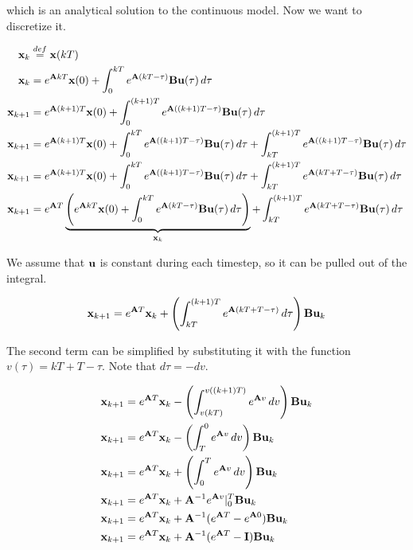 which is an analytical solution to the continuous model. Now we want to
discretize it.

\begin{align*}
  \mathbf{x}_k &\stackrel{def}{=} \mathbf{x}(kT) \\
  \mathbf{x}_k &= e^{\mathbf{A}kT}\mathbf{x}(0) +
    \int_0^{kT} e^{\mathbf{A}(kT - \tau)}\mathbf{B}\mathbf{u}(\tau) \,d\tau \\
  \mathbf{x}_{k+1} &= e^{\mathbf{A}(k + 1)T}\mathbf{x}(0) +
    \int_0^{(k + 1)T} e^{\mathbf{A}((k + 1)T - \tau)}\mathbf{B}\mathbf{u}(\tau) \,d\tau
    \\
  \mathbf{x}_{k+1} &= e^{\mathbf{A}(k + 1)T}\mathbf{x}(0) +
    \int_0^{kT} e^{\mathbf{A}((k + 1)T - \tau)}\mathbf{B}\mathbf{u}(\tau) \,d\tau +
    \int_{kT}^{(k + 1)T} e^{\mathbf{A}((k + 1)T - \tau)}\mathbf{B}\mathbf{u}(\tau)
    \,d\tau \\
  \mathbf{x}_{k+1} &= e^{\mathbf{A}(k + 1)T}\mathbf{x}(0) +
    \int_0^{kT} e^{\mathbf{A}((k + 1)T - \tau)}\mathbf{B}\mathbf{u}(\tau) \,d\tau +
    \int_{kT}^{(k + 1)T} e^{\mathbf{A}(kT + T - \tau)}\mathbf{B}\mathbf{u}(\tau) \,d\tau
    \\
  \mathbf{x}_{k+1} &= e^{\mathbf{A}T} \underbrace{\left(e^{\mathbf{A}kT}\mathbf{x}(0) +
    \int_0^{kT} e^{\mathbf{A}(kT - \tau)}\mathbf{B}\mathbf{u}(\tau)
    \,d\tau\right)}_{\mathbf{x}_k} +
    \int_{kT}^{(k + 1)T} e^{\mathbf{A}(kT + T - \tau)}\mathbf{B}\mathbf{u}(\tau) \,d\tau
\end{align*}

We assume that $\mathbf{u}$ is constant during each timestep, so it can be pulled
out of the integral.

\begin{equation*}
  \mathbf{x}_{k+1} = e^{\mathbf{A}T}\mathbf{x}_k +
    \left(\int_{kT}^{(k + 1)T} e^{\mathbf{A}(kT + T - \tau)} \,d\tau\right)
    \mathbf{B}\mathbf{u}_k
\end{equation*}

The second term can be simplified by substituting it with the function
$v(\tau) = kT + T - \tau$. Note that $d\tau = -dv$.

\begin{align*}
  \mathbf{x}_{k+1} &= e^{\mathbf{A}T}\mathbf{x}_k -
    \left(\int_{v(kT)}^{v((k + 1)T)} e^{\mathbf{A}v} \,dv\right)
    \mathbf{B}\mathbf{u}_k \\
  \mathbf{x}_{k+1} &= e^{\mathbf{A}T}\mathbf{x}_k -
    \left(\int_T^0 e^{\mathbf{A}v} \,dv\right) \mathbf{B}\mathbf{u}_k \\
  \mathbf{x}_{k+1} &= e^{\mathbf{A}T}\mathbf{x}_k +
    \left(\int_0^T e^{\mathbf{A}v} \,dv\right) \mathbf{B}\mathbf{u}_k \\
  \mathbf{x}_{k+1} &= e^{\mathbf{A}T}\mathbf{x}_k +
    \mathbf{A}^{-1}e^{\mathbf{A}v} \rvert_0^T \mathbf{B}\mathbf{u}_k \\
  \mathbf{x}_{k+1} &= e^{\mathbf{A}T}\mathbf{x}_k +
    \mathbf{A}^{-1}(e^{\mathbf{A}T} - e^{\mathbf{A}0}) \mathbf{B}\mathbf{u}_k \\
  \mathbf{x}_{k+1} &= e^{\mathbf{A}T}\mathbf{x}_k +
    \mathbf{A}^{-1}(e^{\mathbf{A}T} - \mathbf{I}) \mathbf{B}\mathbf{u}_k
\end{align*}

